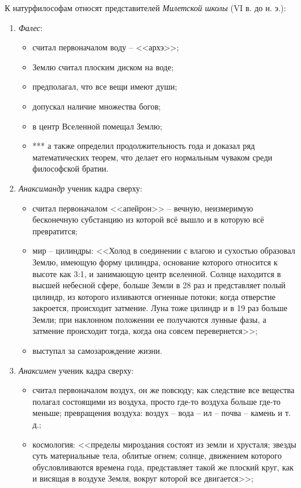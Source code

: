 К натурфилософам относят представителей \textit{Милетской школы} (VI в. до н. э.):
\begin{enumerate}
	\item \textit{Фалес}:
	\begin{itemize}
		\item считал первоначалом воду -- <<архэ>>;
		\item Землю считал плоским диском на воде;
		\item предполагал, что все вещи имеют души;
		\item допускал наличие множества богов;
		\item в центр Вселенной помещал Землю;
		\item *** а также определил продолжительность года и доказал ряд математических теорем, что делает его нормальным чуваком среди философской братии.
	\end{itemize}
	\item \textit{Анаксимандр} ученик кадра сверху:
	\begin{itemize}
		\item считал первоначалом <<апейрон>> -- вечную, неизмеримую бесконечную субстанцию из которой всё вышло и в которую всё превратится;
		\item мир -- цилиндры: <<Холод в соединении с влагою и сухостью образовал Землю, имеющую форму цилиндра, основание которого относится к высоте как 3:1, и занимающую центр вселенной. Солнце находится в высшей небесной сфере, больше Земли в 28 раз и представляет полый цилиндр, из которого изливаются огненные потоки; когда отверстие закроется, происходит затмение. Луна тоже цилиндр и в 19 раз больше Земли; при наклонном положении ее получаются лунные фазы, а затмение происходит тогда, когда она совсем перевернется>>;
		\item выступал за самозарождение жизни.
	\end{itemize}
	\item \textit{Анаксимен} ученик кадра сверху:
	\begin{itemize}
		\item считал первоначалом воздух, он же повсюду; как следствие все вещества полагал состоящими из воздуха, просто где-то воздуха больше где-то меньше; превращения воздуха: воздух -- вода -- ил -- почва -- камень и т. д.; 
		\item космология: <<пределы мироздания состоят из земли и хрусталя; звезды суть материальные тела, облитые огнем; солнце, движением которого обусловливаются времена года, представляет такой же плоский круг, как и висящая в воздухе Земля, вокруг которой все двигается>>;
	\end{itemize}
\end{enumerate}


